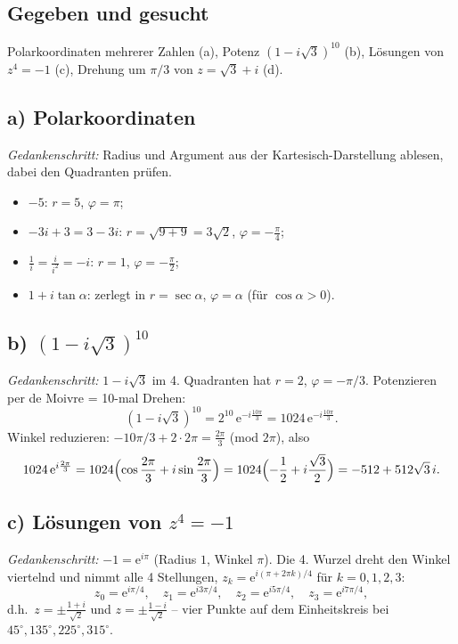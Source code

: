
\subsection*{Gegeben und gesucht}
Polarkoordinaten mehrerer Zahlen (a), Potenz $(1-i\sqrt3)^{10}$ (b),
Lösungen von $z^4=-1$ (c), Drehung um $\pi/3$ von $z=\sqrt3+i$ (d).

\subsection*{a) Polarkoordinaten}
\emph{Gedankenschritt:} Radius und Argument aus der Kartesisch-Darstellung
ablesen, dabei den Quadranten prüfen.
\begin{itemize}
  \item $-5$: $r=5$, $\varphi=\pi$;
  \item $-3i+3=3-3i$: $r=\sqrt{9+9}=3\sqrt2$, $\varphi=-\tfrac\pi4$;
  \item $\frac1i=\frac{i}{i^2}=-i$: $r=1$, $\varphi=-\tfrac\pi2$;
  \item $1+i\tan\alpha$: zerlegt in $r=\sec\alpha$,
        $\varphi=\alpha$ (für $\cos\alpha>0$).
\end{itemize}

\subsection*{b) $(1-i\sqrt3)^{10}$}
\emph{Gedankenschritt:} $1-i\sqrt3$ im 4. Quadranten hat $r=2$,
$\varphi=-\pi/3$. Potenzieren per de Moivre = 10-mal Drehen:
\begin{equation*}
  (1-i\sqrt3)^{10}=2^{10}\,\mathrm e^{-i\frac{10\pi}{3}}
  =1024\,\mathrm e^{-i\frac{10\pi}{3}} .
\end{equation*}
Winkel reduzieren: $-10\pi/3+2\cdot2\pi=\frac{2\pi}{3}$ (mod $2\pi$), also
\begin{equation*}
  1024\,\mathrm e^{i\frac{2\pi}{3}}
  =1024\Bigl(\cos\frac{2\pi}{3}+i\sin\frac{2\pi}{3}\Bigr)
  =1024\Bigl(-\frac12+i\frac{\sqrt3}{2}\Bigr)
  =-512+512\sqrt3\,i .
\end{equation*}

\subsection*{c) Lösungen von $z^4=-1$}
\emph{Gedankenschritt:} $-1=\mathrm e^{i\pi}$ (Radius $1$, Winkel $\pi$).
Die 4. Wurzel dreht den Winkel viertelnd und nimmt alle 4 Stellungen,
$z_k=\mathrm e^{i(\pi+2\pi k)/4}$ für $k=0,1,2,3$:
\begin{equation*}
  z_0=\mathrm e^{i\pi/4},\quad z_1=\mathrm e^{i3\pi/4},\quad
  z_2=\mathrm e^{i5\pi/4},\quad z_3=\mathrm e^{i7\pi/4},
\end{equation*}
d.h.\ $z=\pm\frac{1+i}{\sqrt2}$ und $z=\pm\frac{1-i}{\sqrt2}$ -- vier
Punkte auf dem Einheitskreis bei $45^\circ,135^\circ,225^\circ,315^\circ$.

